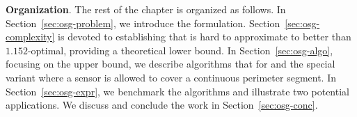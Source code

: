 

\textbf{Organization}. The rest of the chapter is organized as follows. 
In Section~\ref{sec:osg-problem}, we introduce the \osgt formulation. 
Section~\ref{sec:osg-complexity} is devoted to establishing that \osgt is 
hard to approximate to better than $1.152$-optimal, providing a theoretical
lower bound. In Section~\ref{sec:osg-algo}, focusing on the upper bound, 
we describe algorithms that for \osgt and the special \opgt variant 
where a sensor is allowed to cover a continuous perimeter segment.
In Section~\ref{sec:osg-expr}, we benchmark the algorithms and illustrate two 
potential applications. We discuss and conclude the work in Section~\ref{sec:osg-conc}.



